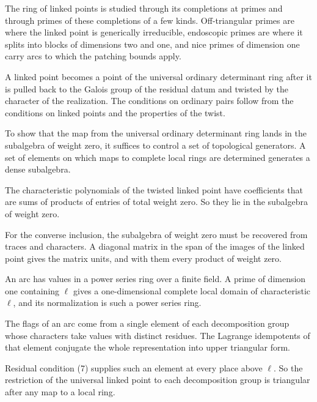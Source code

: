 The ring of linked points is studied through its completions at primes and through primes of these completions of a few kinds. Off-triangular primes are where the linked point is generically irreducible, endoscopic primes are where it splits into blocks of dimensions two and one, and nice primes of dimension one carry arcs to which the patching bounds apply.

A linked point becomes a point of the universal ordinary determinant ring after it is pulled back to the Galois group of the residual datum and twisted by the character of the realization. The conditions on ordinary pairs follow from the conditions on linked points and the properties of the twist.

To show that the map from the universal ordinary determinant ring lands in the subalgebra of weight zero, it suffices to control a set of topological generators. A set of elements on which maps to complete local rings are determined generates a dense subalgebra.

The characteristic polynomials of the twisted linked point have coefficients that are sums of products of entries of total weight zero. So they lie in the subalgebra of weight zero.

For the converse inclusion, the subalgebra of weight zero must be recovered from traces and characters. A diagonal matrix in the span of the images of the linked point gives the matrix units, and with them every product of weight zero.

An arc has values in a power series ring over a finite field. A prime of dimension one containing $\ell$ gives a one-dimensional complete local domain of characteristic $\ell$, and its normalization is such a power series ring.

The flags of an arc come from a single element of each decomposition group whose characters take values with distinct residues. The Lagrange idempotents of that element conjugate the whole representation into upper triangular form.

Residual condition (7) supplies such an element at every place above $\ell$. So the restriction of the universal linked point to each decomposition group is triangular after any map to a local ring.

